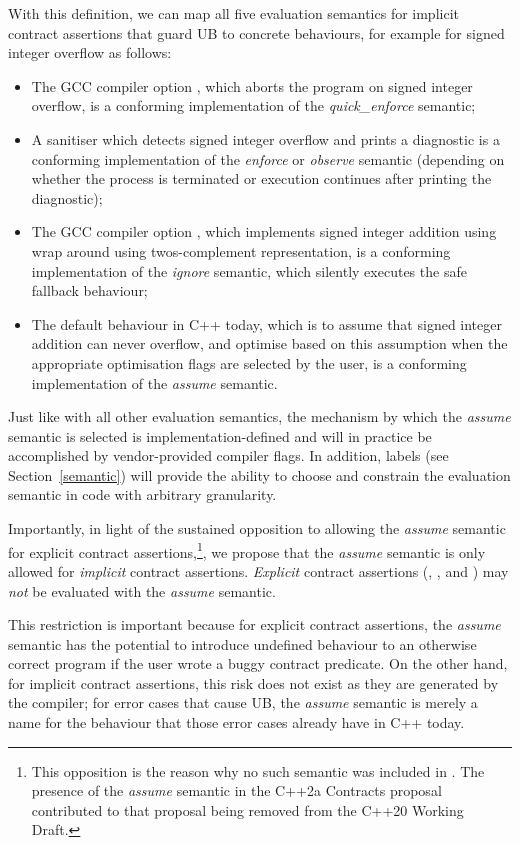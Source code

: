 With this definition, we can map all five evaluation semantics for implicit contract assertions that guard UB to concrete behaviours, for example for signed integer overflow as follows:
\begin{itemize}
\item The GCC compiler option , which aborts the program on signed integer overflow, is a conforming implementation of the \emph{quick_enforce} semantic;
\item A sanitiser which detects signed integer overflow and prints a diagnostic is a conforming
implementation of the \emph{enforce} or \emph{observe} semantic (depending on whether the
process is terminated or execution continues after printing the diagnostic);
\item The GCC compiler option , which implements signed integer addition using wrap around using twos-complement representation, is a conforming implementation of the \emph{ignore} semantic, which silently executes the safe fallback behaviour;
\item The default behaviour in C++ today, which is to assume that signed integer addition can never overflow, and optimise based on this assumption when the appropriate optimisation flags are selected by the user, is a conforming implementation of the \emph{assume} semantic.
\end{itemize}
Just like with all other evaluation semantics, the mechanism by which the \emph{assume} semantic is selected is implementation-defined and will in practice be accomplished by vendor-provided compiler flags. In addition, labels (see Section~\ref{semantic}) will provide the ability to choose and constrain the evaluation semantic in code with arbitrary granularity.

Importantly, in light of the sustained opposition to allowing the \emph{assume} semantic for explicit contract assertions,\footnote{This opposition is the reason why  no such semantic was included in \cite{P2900R14}. The presence of the \emph{assume} semantic in the C++2a Contracts proposal \cite{P0542R5} contributed to that proposal being removed from the C++20 Working Draft.}, we propose that the \emph{assume} semantic is only allowed for \emph{implicit} contract assertions. \emph{Explicit} contract assertions (, , and ) may \emph{not} be evaluated with the \emph{assume} semantic.

This restriction is important because for explicit contract assertions, the \emph{assume} semantic  has the potential to introduce undefined behaviour to an otherwise correct program if the user wrote a buggy contract predicate. On the other hand, for implicit contract assertions, this risk does not exist as they are generated by the compiler; for error cases that cause UB, the \emph{assume} semantic is merely a name for the behaviour that those error cases already have in C++ today.

